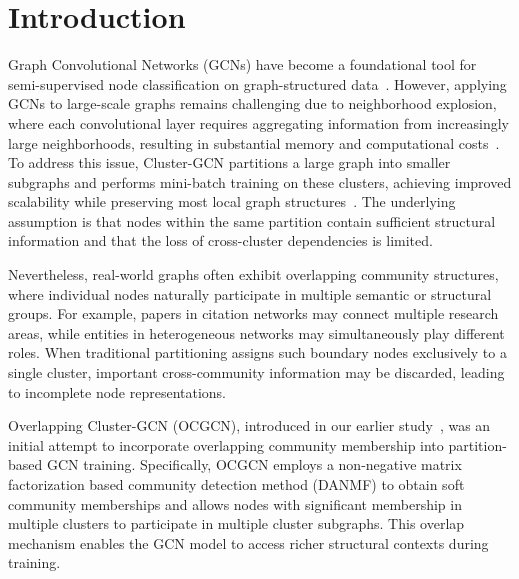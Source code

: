 \documentclass[a4paper,11pt,oneside,onecolumn,preprint]{elsarticle}
\numberwithin{equation}{section}
\begin{document}

\tableofcontents


\section{Introduction}
\label{sec:introduction}

Graph Convolutional Networks (GCNs) have become a foundational tool for semi-supervised node classification on graph-structured data~\cite{kipf2017semi}.
However, applying GCNs to large-scale graphs remains challenging due to neighborhood explosion, where each convolutional layer requires aggregating information from increasingly large neighborhoods, resulting in substantial memory and computational costs~\cite{Cluster-GCN}.
To address this issue, Cluster-GCN partitions a large graph into smaller subgraphs and performs mini-batch training on these clusters, achieving improved scalability while preserving most local graph structures~\cite{Cluster-GCN}.
The underlying assumption is that nodes within the same partition contain sufficient structural information and that the loss of cross-cluster dependencies is limited.

Nevertheless, real-world graphs often exhibit overlapping community structures, where individual nodes naturally participate in multiple semantic or structural groups.
For example, papers in citation networks may connect multiple research areas, while entities in heterogeneous networks may simultaneously play different roles.
When traditional partitioning assigns such boundary nodes exclusively to a single cluster, important cross-community information may be discarded, leading to incomplete node representations.

Overlapping Cluster-GCN (OCGCN), introduced in our earlier study~\cite{Amintoosi2021}, was an initial attempt to incorporate overlapping community membership into partition-based GCN training.
Specifically, OCGCN employs a non-negative matrix factorization based community detection method (DANMF) to obtain soft community memberships and allows nodes with significant membership in multiple clusters to participate in multiple cluster subgraphs.
This overlap mechanism enables the GCN model to access richer structural contexts during training.
\end{document}
